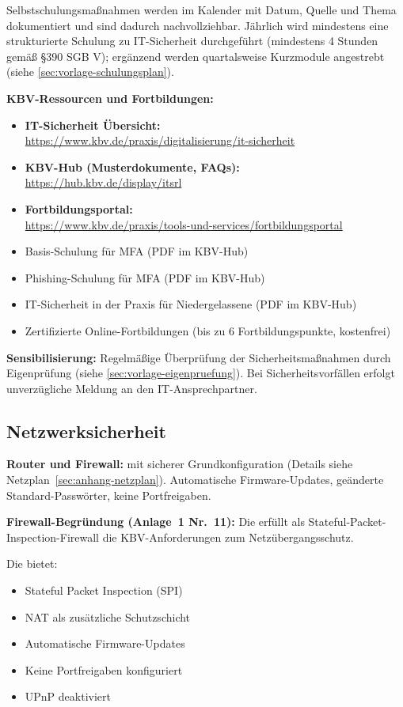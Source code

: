 \Dokumentation Selbstschulungsmaßnahmen werden im Kalender mit Datum, Quelle und
Thema dokumentiert und sind dadurch nachvollziehbar. Jährlich wird mindestens eine
strukturierte Schulung zu IT-Sicherheit durchgeführt (mindestens 4 Stunden gemäß §390 SGB V);
ergänzend werden quartalsweise Kurzmodule angestrebt (siehe \cref{sec:vorlage-schulungsplan}).

\textbf{KBV-Ressourcen und Fortbildungen:}
\begin{itemize}
  \item \textbf{IT-Sicherheit Übersicht:} \\
    \url{https://www.kbv.de/praxis/digitalisierung/it-sicherheit}
  \item \textbf{KBV-Hub (Musterdokumente, FAQs):} \\
    \url{https://hub.kbv.de/display/itsrl}
  \item \textbf{Fortbildungsportal:} \\
    \url{https://www.kbv.de/praxis/tools-und-services/fortbildungsportal}
  \item Basis-Schulung für MFA (PDF im KBV-Hub)
  \item Phishing-Schulung für MFA (PDF im KBV-Hub)
  \item IT-Sicherheit in der Praxis für Niedergelassene (PDF im KBV-Hub)
  \item Zertifizierte Online-Fortbildungen (bis zu 6 Fortbildungspunkte, kostenfrei)
\end{itemize}

\textbf{Sensibilisierung:} Regelmäßige Überprüfung der Sicherheitsmaßnahmen durch
Eigenprüfung (siehe \cref{sec:vorlage-eigenpruefung}). Bei Sicherheitsvorfällen
erfolgt unverzügliche Meldung an den IT-Ansprechpartner.

\subsection{Netzwerksicherheit}
\label{sec:netzwerk}

\textbf{Router und Firewall:} \RouterModell{} mit sicherer Grundkonfiguration (Details
siehe Netzplan~\ref{sec:anhang-netzplan}). Automatische Firmware-Updates, geänderte
Standard-Passwörter, keine Portfreigaben.

\textbf{Firewall-Begründung (Anlage~1 Nr.~11):} Die \RouterModell{} erfüllt als
Stateful-Packet-Inspection-Firewall die KBV-Anforderungen zum Netzübergangsschutz.

Die \RouterModell{} bietet:
\begin{itemize}
  \item Stateful Packet Inspection (SPI)
  \item NAT als zusätzliche Schutzschicht
  \item Automatische Firmware-Updates
  \item Keine Portfreigaben konfiguriert
  \item UPnP deaktiviert
\end{itemize}

